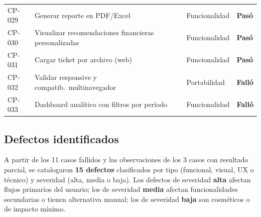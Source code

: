 \begin{longtable}{>{\small}p{1.3cm} >{\small}p{6.5cm} >{\small}p{3.2cm} >{\small}p{3.2cm}}
  CP-029 & Generar reporte en PDF/Excel                 & Funcionalidad  & \textcolor{OliveGreen}{\textbf{Pasó}}   \\[3pt]
  CP-030 & Visualizar recomendaciones financieras personalizadas & Funcionalidad & \textcolor{OliveGreen}{\textbf{Pasó}}  \\[3pt]
  CP-031 & Cargar ticket por archivo (web)              & Funcionalidad  & \textcolor{OliveGreen}{\textbf{Pasó}}   \\[3pt]
  CP-032 & Validar responsive y compatib.\ multinavegador & Portabilidad & \textcolor{BrickRed}{\textbf{Falló}}    \\[3pt]
  CP-033 & Dashboard analítico con filtros por período  & Funcionalidad  & \textcolor{BrickRed}{\textbf{Falló}}    \\
\end{longtable}

\subsection{Defectos identificados}
\label{subsec:defectos}

A partir de los 11 casos fallidos y las observaciones de los 3 casos con resultado parcial, se catalogaron \textbf{15 defectos} clasificados por tipo (funcional, visual, UX o técnico) y severidad (alta, media o baja). Los defectos de severidad \textbf{alta} afectan flujos primarios del usuario; los de severidad \textbf{media} afectan funcionalidades secundarias o tienen alternativa manual; los de severidad \textbf{baja} son cosméticos o de impacto mínimo.

